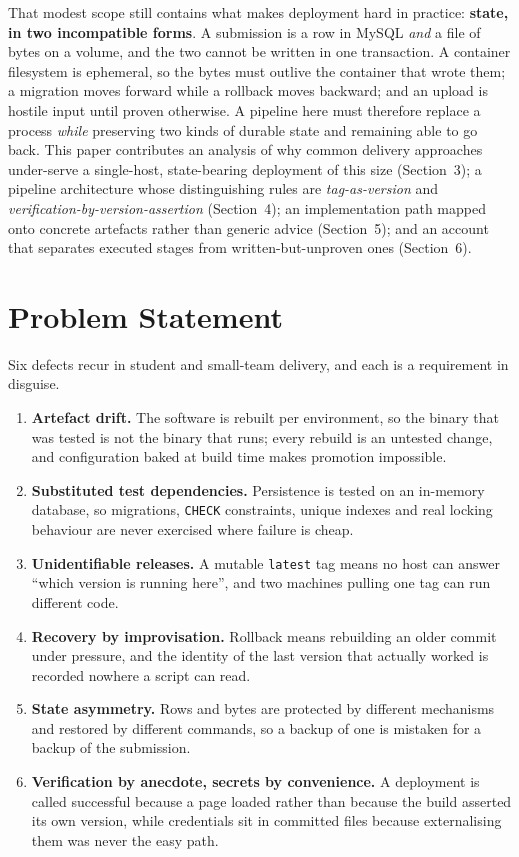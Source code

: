 \documentclass[10pt,a4paper]{article}
\begin{document}
That modest scope still contains what makes deployment hard in practice: \textbf{state, in two
incompatible forms}. A submission is a row in MySQL \emph{and} a file of bytes on a volume, and
the two cannot be written in one transaction. A container filesystem is ephemeral, so the bytes
must outlive the container that wrote them; a migration moves forward while a rollback moves
backward; and an upload is hostile input until proven otherwise. A pipeline here must therefore
replace a process \emph{while} preserving two kinds of durable state and remaining able to go
back. This paper contributes an analysis of why common delivery approaches under-serve a
single-host, state-bearing deployment of this size (Section~3); a pipeline architecture whose
distinguishing rules are \emph{tag-as-version} and \emph{verification-by-version-assertion}
(Section~4); an implementation path mapped onto concrete artefacts rather than generic advice
(Section~5); and an account that separates executed stages from written-but-unproven ones
(Section~6).

\section{Problem Statement}

Six defects recur in student and small-team delivery, and each is a requirement in disguise.

\begin{enumerate}[label=\textbf{D\arabic*.},leftmargin=2.3em]
  \item \textbf{Artefact drift.} The software is rebuilt per environment, so the binary that was
        tested is not the binary that runs; every rebuild is an untested change, and
        configuration baked at build time makes promotion impossible.
  \item \textbf{Substituted test dependencies.} Persistence is tested on an in-memory database, so
        migrations, \texttt{CHECK} constraints, unique indexes and real locking behaviour are
        never exercised where failure is cheap.
  \item \textbf{Unidentifiable releases.} A mutable \texttt{latest} tag means no host can answer
        ``which version is running here'', and two machines pulling one tag can run different
        code.
  \item \textbf{Recovery by improvisation.} Rollback means rebuilding an older commit under
        pressure, and the identity of the last version that actually worked is recorded nowhere a
        script can read.
  \item \textbf{State asymmetry.} Rows and bytes are protected by different mechanisms and
        restored by different commands, so a backup of one is mistaken for a backup of the
        submission.
  \item \textbf{Verification by anecdote, secrets by convenience.} A deployment is called
        successful because a page loaded rather than because the build asserted its own version,
        while credentials sit in committed files because externalising them was never the easy
        path.
\end{enumerate}
\end{document}
